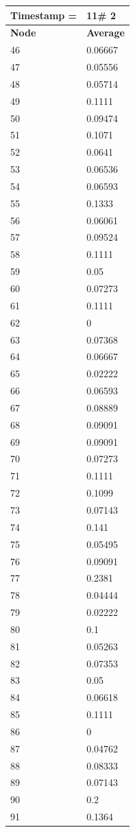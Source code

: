 \begin{tabular}{|l||l|}
\hline
\textbf{Timestamp =} & \textbf{11}\# 2\\\hline
	\textbf{Node} & \textbf{Average} \\ \hline
\hline
	46 & 0.06667 \\ \hline
	47 & 0.05556 \\ \hline
	48 & 0.05714 \\ \hline
	49 & 0.1111 \\ \hline
	50 & 0.09474 \\ \hline
	51 & 0.1071 \\ \hline
	52 & 0.0641 \\ \hline
	53 & 0.06536 \\ \hline
	54 & 0.06593 \\ \hline
	55 & 0.1333 \\ \hline
	56 & 0.06061 \\ \hline
	57 & 0.09524 \\ \hline
	58 & 0.1111 \\ \hline
	59 & 0.05 \\ \hline
	60 & 0.07273 \\ \hline
	61 & 0.1111 \\ \hline
	62 & 0 \\ \hline
	63 & 0.07368 \\ \hline
	64 & 0.06667 \\ \hline
	65 & 0.02222 \\ \hline
	66 & 0.06593 \\ \hline
	67 & 0.08889 \\ \hline
	68 & 0.09091 \\ \hline
	69 & 0.09091 \\ \hline
	70 & 0.07273 \\ \hline
	71 & 0.1111 \\ \hline
	72 & 0.1099 \\ \hline
	73 & 0.07143 \\ \hline
	74 & 0.141 \\ \hline
	75 & 0.05495 \\ \hline
	76 & 0.09091 \\ \hline
	77 & 0.2381 \\ \hline
	78 & 0.04444 \\ \hline
	79 & 0.02222 \\ \hline
	80 & 0.1 \\ \hline
	81 & 0.05263 \\ \hline
	82 & 0.07353 \\ \hline
	83 & 0.05 \\ \hline
	84 & 0.06618 \\ \hline
	85 & 0.1111 \\ \hline
	86 & 0 \\ \hline
	87 & 0.04762 \\ \hline
	88 & 0.08333 \\ \hline
	89 & 0.07143 \\ \hline
	90 & 0.2 \\ \hline
	91 & 0.1364 \\ \hline
\end{tabular}

